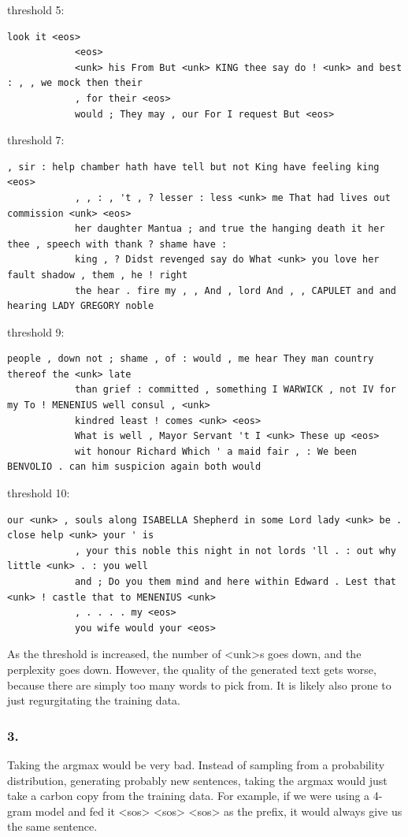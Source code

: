 \documentclass[12pt]{article}
\theoremstyle{definitionstyle}
\begin{document}
        threshold 5:
        \begin{lstlisting}[breaklines]
            look it <eos> 
            <eos> 
            <unk> his From But <unk> KING thee say do ! <unk> and best : , , we mock then their 
            , for their <eos> 
            would ; They may , our For I request But <eos>
        \end{lstlisting}
        threshold 7:
        \begin{lstlisting}[breaklines]
            , sir : help chamber hath have tell but not King have feeling king <eos> 
            , , : , 't , ? lesser : less <unk> me That had lives out commission <unk> <eos> 
            her daughter Mantua ; and true the hanging death it her thee , speech with thank ? shame have : 
            king , ? Didst revenged say do What <unk> you love her fault shadow , them , he ! right 
            the hear . fire my , , And , lord And , , CAPULET and and hearing LADY GREGORY noble
        \end{lstlisting}
        threshold 9:
        \begin{lstlisting}[breaklines]
            people , down not ; shame , of : would , me hear They man country thereof the <unk> late 
            than grief : committed , something I WARWICK , not IV for my To ! MENENIUS well consul , <unk> 
            kindred least ! comes <unk> <eos> 
            What is well , Mayor Servant 't I <unk> These up <eos> 
            wit honour Richard Which ' a maid fair , : We been BENVOLIO . can him suspicion again both would
        \end{lstlisting}
        threshold 10:
        \begin{lstlisting}[breaklines]
            our <unk> , souls along ISABELLA Shepherd in some Lord lady <unk> be . close help <unk> your ' is 
            , your this noble this night in not lords 'll . : out why little <unk> . : you well 
            and ; Do you them mind and here within Edward . Lest that <unk> ! castle that to MENENIUS <unk> 
            , . . . . my <eos> 
            you wife would your <eos>
        \end{lstlisting}
        As the threshold is increased, the number of <unk>s goes down, and the perplexity goes down. However, the quality of the generated text gets worse, because there are simply too many words to pick from. It is likely also prone to just regurgitating the training data.

    \subsubsection*{3.} Taking the argmax would be very bad. Instead of sampling from a probability distribution, generating probably new sentences, taking the argmax would just take a carbon copy from the training data. For example, if we were using a 4-gram model and fed it <sos> <sos> <sos> as the prefix, it would always give us the same sentence. 
\end{document}
